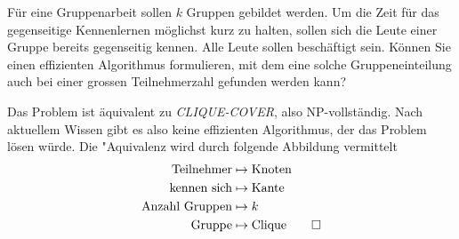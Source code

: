 Für eine Gruppenarbeit sollen $k$ Gruppen gebildet werden.
Um die Zeit für das gegenseitige Kennenlernen möglichst
kurz zu halten, sollen sich die Leute einer Gruppe bereits
gegenseitig kennen. Alle Leute sollen beschäftigt sein.
Können Sie einen effizienten Algorithmus
formulieren, mit dem eine solche Gruppeneinteilung auch bei
einer grossen Teilnehmerzahl gefunden werden kann?


\begin{loesung}
Das Problem ist äquivalent zu \textsl{CLIQUE-COVER}, also
NP-vollständig. Nach aktuellem Wissen gibt es also keine
effizienten Algorithmus, der das Problem lösen würde. Die
"Aquivalenz wird durch folgende Abbildung vermittelt
\begin{align*}
\text{Teilnehmer}&\mapsto\text{Knoten}\\
\text{kennen sich}&\mapsto\text{Kante}\\
\text{Anzahl Gruppen}&\mapsto k\\
\text{Gruppe}&\mapsto\text{Clique}
\qedhere
\end{align*}
\end{loesung}
